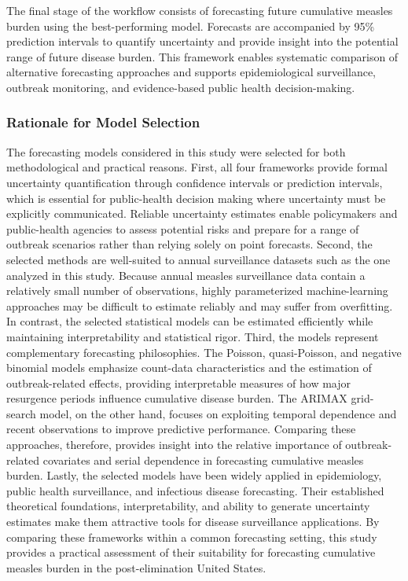 \documentclass[utf8]{FrontiersinHarvard} %
\begin{document}
The final stage of the workflow consists of forecasting future cumulative measles burden using the best-performing model. Forecasts are accompanied by 95\% prediction intervals to quantify uncertainty and provide insight into the potential range of future disease burden. This framework enables systematic comparison of alternative forecasting approaches and supports epidemiological surveillance, outbreak monitoring, and evidence-based public health decision-making.


\subsubsection{Rationale for Model Selection}
The forecasting models considered in this study were selected for both methodological and practical reasons. First, all four frameworks provide formal uncertainty quantification through confidence intervals or prediction intervals, which is essential for public-health decision making where uncertainty must be explicitly communicated. Reliable uncertainty estimates enable policymakers and public-health agencies to assess potential risks and prepare for a range of outbreak scenarios rather than relying solely on point forecasts.
Second, the selected methods are well-suited to annual surveillance datasets such as the one analyzed in this study. Because annual measles surveillance data contain a relatively small number of observations, highly parameterized machine-learning approaches may be difficult to estimate reliably and may suffer from overfitting. In contrast, the selected statistical models can be estimated efficiently while maintaining interpretability and statistical rigor.
Third, the models represent complementary forecasting philosophies. The Poisson, quasi-Poisson, and negative binomial models emphasize count-data characteristics and the estimation of outbreak-related effects, providing interpretable measures of how major resurgence periods influence cumulative disease burden. The ARIMAX grid-search model, on the other hand, focuses on exploiting temporal dependence and recent observations to improve predictive performance. Comparing these approaches, therefore, provides insight into the relative importance of outbreak-related covariates and serial dependence in forecasting cumulative measles burden.
Lastly, the selected models have been widely applied in epidemiology, public health surveillance, and infectious disease forecasting. Their established theoretical foundations, interpretability, and ability to generate uncertainty estimates make them attractive tools for disease surveillance applications. By comparing these frameworks within a common forecasting setting, this study provides a practical assessment of their suitability for forecasting cumulative measles burden in the post-elimination United States.
\end{document}
